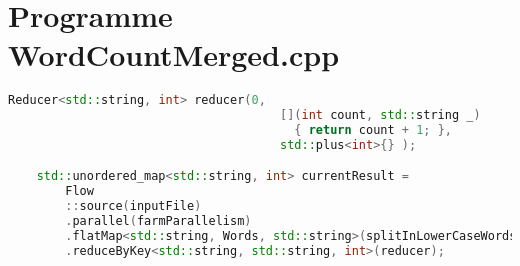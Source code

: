 \section{Programme {WordCountMerged.cpp}}
\label{appendice-code-wordcount-f.ann}
\begin{lstlisting}[gobble=4,basicstyle=\ttfamily\footnotesize,language=c++]
    Reducer<std::string, int> reducer(0, 
                                      [](int count, std::string _)
                                        { return count + 1; },
                                      std::plus<int>{} );

    std::unordered_map<std::string, int> currentResult = 
        Flow
        ::source(inputFile)
        .parallel(farmParallelism)
        .flatMap<std::string, Words, std::string>(splitInLowerCaseWords)
        .reduceByKey<std::string, std::string, int>(reducer);  
\end{lstlisting}
